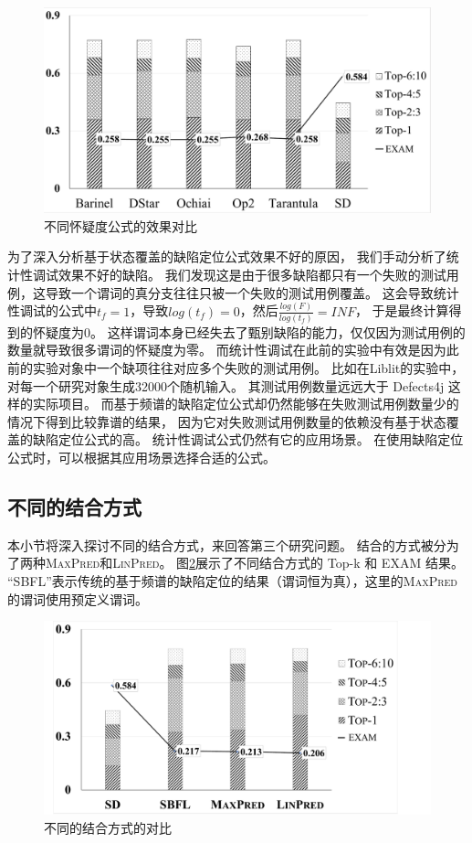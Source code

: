 
\begin{figure}[htbp] 
\centering 
\includegraphics[width=12cm]{figure/formulas} 
\caption{不同怀疑度公式的效果对比} 
\label{fig:formulas}
\end{figure}

为了深入分析基于状态覆盖的缺陷定位公式效果不好的原因，
我们手动分析了统计性调试效果不好的缺陷。
我们发现这是由于很多缺陷都只有一个失败的测试用例，这导致一个谓词的真分支往往只被一个失败的测试用例覆盖。
这会导致统计性调试的公式中$t_f = 1$，导致$log(t_f) = 0$，然后$\frac{log(F)}{log(t_f)} = INF$，
于是最终计算得到的怀疑度为0。
这样谓词本身已经失去了甄别缺陷的能力，仅仅因为测试用例的数量就导致很多谓词的怀疑度为零。
而统计性调试在此前的实验中有效是因为此前的实验对象中一个缺项往往对应多个失败的测试用例。
比如在Liblit\parencite{Liblit2005Scalable}的实验中，对每一个研究对象生成32000个随机输入。
其测试用例数量远远大于 Defects4j 这样的实际项目。
而基于频谱的缺陷定位公式却仍然能够在失败测试用例数量少的情况下得到比较靠谱的结果，
因为它对失败测试用例数量的依赖没有基于状态覆盖的缺陷定位公式的高。
统计性调试公式仍然有它的应用场景。
在使用缺陷定位公式时，可以根据其应用场景选择合适的公式。

\subsection{不同的结合方式}

本小节将深入探讨不同的结合方式，来回答第三个研究问题。
结合的方式被分为了两种\textsc{MaxPred}和\textsc{LinPred}。
图\ref{fig:diff-comb-compare}展示了不同结合方式的 Top-k 和 EXAM 结果。
“SBFL”表示传统的基于频谱的缺陷定位的结果（谓词恒为真），这里的\textsc{MaxPred}的谓词使用预定义谓词。

\begin{figure}[htbp] 
\centering 
\includegraphics[width=12cm]{figure/diff-comb-compare} 
\caption{不同的结合方式的对比} 
\label{fig:diff-comb-compare}
\end{figure}


